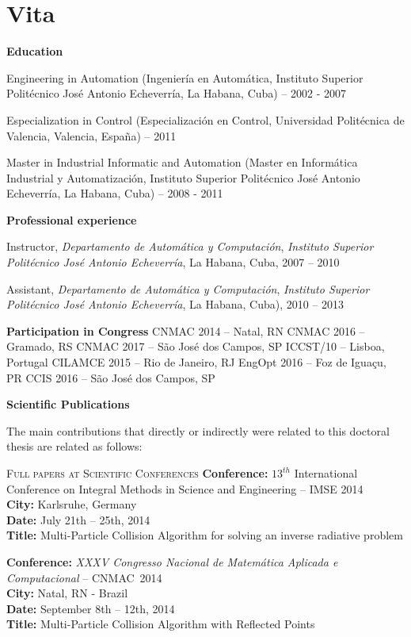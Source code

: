 \renewcommand {\chaptername}{ANNEX}
\addto\captionsenglish{\renewcommand{\chaptername}{Lecture}}

\chapter{Vita}
\label{vita}

\textbf{Education}

Engineering in Automation (Ingeniería en Automática, Instituto Superior Politécnico José Antonio Echeverría, La Habana, Cuba) – 2002 - 2007

Especialization in Control (Especialización en Control, Universidad Politécnica de Valencia, Valencia, España) – 2011

Master in Industrial Informatic and Automation (Master en Informática Industrial y Automatización, Instituto Superior Politécnico José Antonio Echeverría, La Habana, Cuba) – 2008 - 2011

\textbf{Professional experience}

Instructor, \textit{Departamento de Automática y Computación}, \textit{Instituto Superior Politécnico José Antonio Echeverría}, La Habana, Cuba, 2007 -- 2010
    
Assistant, \textit{Departamento de Automática y Computación}, \textit{Instituto Superior Politécnico José Antonio Echeverría}, La Habana, Cuba), 2010 -- 2013

\textbf{Participation in Congress}
CNMAC 2014 – Natal, RN
CNMAC 2016 – Gramado, RS
CNMAC 2017 – São José dos Campos, SP
ICCST/10 – Lisboa, Portugal
CILAMCE 2015 – Rio de Janeiro, RJ
EngOpt 2016 – Foz de Iguaçu, PR
CCIS 2016 – São José dos Campos, SP

\textbf{Scientific Publications}

The main contributions that directly or indirectly were related to this doctoral thesis are related as follows:

\textsc{Full papers at Scientific Conferences}
\textbf{Conference:} $13^{th}$ International Conference on Integral Methods in Science and Engineering -- IMSE 2014\\
\textbf{City:} Karlsruhe, Germany \\
\textbf{Date:} July 21th -- 25th, 2014 \\
\textbf{Title:} Multi-Particle Collision Algorithm for solving an inverse radiative problem

\textbf{Conference:} \textit{XXXV Congresso Nacional de Matem\'atica Aplicada e Computacional} -- \mbox{CNMAC 2014}\\
\textbf{City:} Natal, RN - Brazil \\
\textbf{Date:} September 8th -- 12th, 2014\\
\textbf{Title:} Multi-Particle Collision Algorithm with Reflected Points

